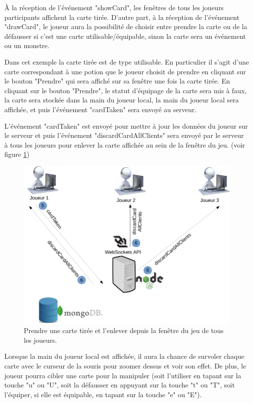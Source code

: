 \documentclass[12pt]{report}
\begin{document}
			À la réception de l'événement "showCard", les fenêtres de tous les joueurs participants affichent la carte tirée. D'autre part, à la réception de l'événement "drawCard", le joueur aura la possibilité de choisir entre prendre la carte ou de la défausser si c'est une carte utilisable/équipable, sinon la carte sera un événement ou un monstre.

			Dans cet exemple la carte tirée est de type utilisable. En particulier il s'agit d'une carte correspondant à une potion que le joueur choisit de prendre en cliquant sur le bouton "Prendre" qui sera affiché sur sa fenêtre une fois la carte tirée. En cliquant sur le bouton "Prendre", le statut d'équipage de la carte sera mis à faux, la carte sera stockée dans la main du joueur local, la main du joueur local sera affichée, et puis l'événement "cardTaken" sera envoyé au serveur.

			L'événement "cardTaken" est envoyé pour mettre à jour les données du joueur sur le serveur et puis l'événement "discardCardAllClients" sera envoyé par le serveur à tous les joueurs pour enlever la carte affichée au sein de la fenêtre du jeu. (voir figure \ref{fig:useCase22})

			\begin{figure}[h!]
		  	\centering
		    \includegraphics[scale=0.5]{images/useCase22.png}
		    \caption{Prendre une carte tirée et l'enlever depuis la fenêtre du jeu de tous les joueurs.}
				\label{fig:useCase22}
		  \end{figure}

			Lorsque la main du joueur local est affichée, il aura la chance de survoler chaque carte avec le curseur de la souris pour zoomer dessus et voir son effet. De plus, le joueur pourra cibler une carte pour la manipuler (soit l'utiliser en tapant sur la touche "u" ou "U", soit la défausser en appuyant sur la touche "t" ou "T", soit l'équiper, si elle est équipable, en tapant sur la touche "e" ou "E").
\end{document}
